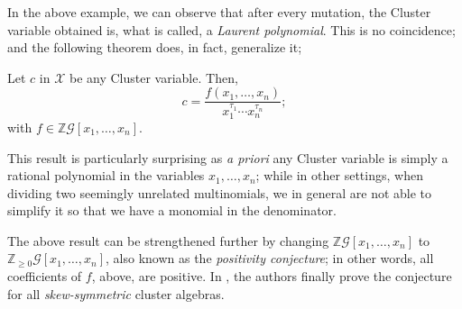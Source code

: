 In the above example, we can observe that after every mutation, the Cluster variable obtained is, what is called, a \emph{Laurent polynomial}. This is no coincidence; and the following theorem does, in fact, generalize it;
\begin{theorem}
Let $c$ in $\mathcal{X}$ be any Cluster variable. Then,
\begin{equation*}
    c = \dfrac{f(x_1,\dots,x_n)}{x_1^{\tau_1}\cdots x_n^{\tau_n}};
\end{equation*}
with $f \in \mathbb{Z}\mathcal{G}[x_1,\dots,x_n]$.
\end{theorem}
This result is particularly surprising as \emph{a priori} any Cluster variable is simply a rational polynomial in the variables $x_1,\dots,x_n$; while in other settings, when dividing two seemingly unrelated multinomials, we in general are not able to simplify it so that we have a monomial in the denominator. 
\begin{remark}
The above result can be strengthened further by changing $\mathbb{Z}\mathcal{G}[x_1,\dots,x_n]$ to $\mathbb{Z}_{\geq 0}\mathcal{G}[x_1,\dots,x_n]$, also known as the \emph{positivity conjecture}; in other words, all coefficients of $f$, above, are positive. In \cite{LS}, the authors finally prove the conjecture for all \emph{skew-symmetric} cluster algebras. 
\end{remark}

